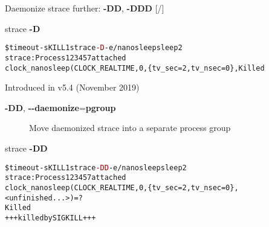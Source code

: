 \documentclass[unicode,aspectratio=169,xcolor={table,dvipsnames,usernames}]{beamer}
\begin{document}
\begin{frame}[fragile]{Daemonize strace further: \textbf{-DD}, \textbf{-DDD} \hfill [\insertframenumber/\inserttotalframenumber]}
\begin{block}{strace \textbf{-D}}
\small
\begin{alltt}
\$ timeout -s KILL 1 strace \textcolor{darkred}{-D} -e/nanosleep sleep 2
strace: Process 123457 attached
clock_nanosleep(CLOCK_REALTIME, 0, \{tv_sec=2, tv_nsec=0\}, Killed
\end{alltt}
\end{block}

\begin{block}{Introduced in v5.4 (November 2019)}
\begin{description}
	\item[\textbf{-DD}, \textbf{-{}-daemonize}=\textbf{pgroup}] Move daemonized strace into a separate process group
\end{description}
\end{block}

\begin{block}{strace \textbf{-DD}}
\small
\begin{alltt}
\$ timeout -s KILL 1 strace \textcolor{darkred}{-DD} -e/nanosleep sleep 2
strace: Process 123457 attached
clock_nanosleep(CLOCK_REALTIME, 0, \{tv_sec=2, tv_nsec=0\}, <unfinished ...>) = ?
Killed
+++ killed by SIGKILL +++
\end{alltt}
\end{block}
\end{frame}
\end{document}

